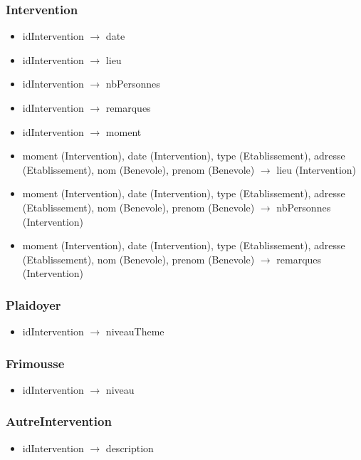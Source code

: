 \subsubsection*{Intervention}
\begin{itemize}
\item[]	idIntervention $\rightarrow$ date
\item[]	idIntervention $\rightarrow$ lieu
\item[]	idIntervention $\rightarrow$ nbPersonnes
\item[]	idIntervention $\rightarrow$ remarques
\item[]	idIntervention $\rightarrow$ moment
\item[] moment (Intervention), date (Intervention), type (Etablissement), adresse (Etablissement), nom (Benevole), prenom (Benevole) $\rightarrow$ lieu (Intervention)
\item[] moment (Intervention), date (Intervention), type (Etablissement), adresse (Etablissement), nom (Benevole), prenom (Benevole) $\rightarrow$ nbPersonnes (Intervention)
\item[] moment (Intervention), date (Intervention), type (Etablissement), adresse (Etablissement), nom (Benevole), prenom (Benevole) $\rightarrow$ remarques (Intervention)
\end{itemize}

\subsubsection*{Plaidoyer}
\begin{itemize}
\item[]	idIntervention $\rightarrow$ niveauTheme
\end{itemize}

\subsubsection*{Frimousse}
\begin{itemize}
\item[] idIntervention $\rightarrow$ niveau
\end{itemize}

\subsubsection*{AutreIntervention}
\begin{itemize}
\item[] idIntervention $\rightarrow$ description
\end{itemize}

